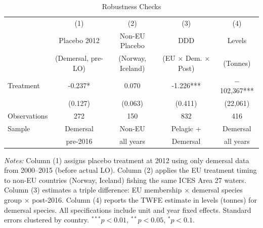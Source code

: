 \begin{table}[htbp]
\centering
\caption{Robustness Checks}
\label{tab:robustness}
\small
\begin{tabular}{lcccc}
\hline\hline
 & (1) & (2) & (3) & (4) \\
 & Placebo 2012 & Non-EU Placebo & DDD & Levels \\
 & (Demersal, pre-LO) & (Norway, Iceland) & (EU $\times$ Dem. $\times$ Post) & (Tonnes) \\
\hline
Treatment & -0.237* & 0.070 & -1.226*** & $-$102,367*** \\
 & (0.127) & (0.063) & (0.411) & (22,061) \\
\hline
Observations & 272 & 150 & 832 & 416 \\
Sample & Demersal & Non-EU & Pelagic + & Demersal \\
       & pre-2016 & all years & Demersal & all years \\
\hline\hline
\end{tabular}
\begin{tablenotes}[flushleft]
\small
\item \textit{Notes:} Column (1) assigns placebo treatment at 2012 using only demersal data from 2000--2015 (before actual LO). Column (2) applies the EU treatment timing to non-EU countries (Norway, Iceland) fishing the same ICES Area 27 waters. Column (3) estimates a triple difference: EU membership $\times$ demersal species group $\times$ post-2016. Column (4) reports the TWFE estimate in levels (tonnes) for demersal species. All specifications include unit and year fixed effects. Standard errors clustered by country. $^{***}p<0.01$, $^{**}p<0.05$, $^{*}p<0.1$.
\end{tablenotes}
\end{table}

